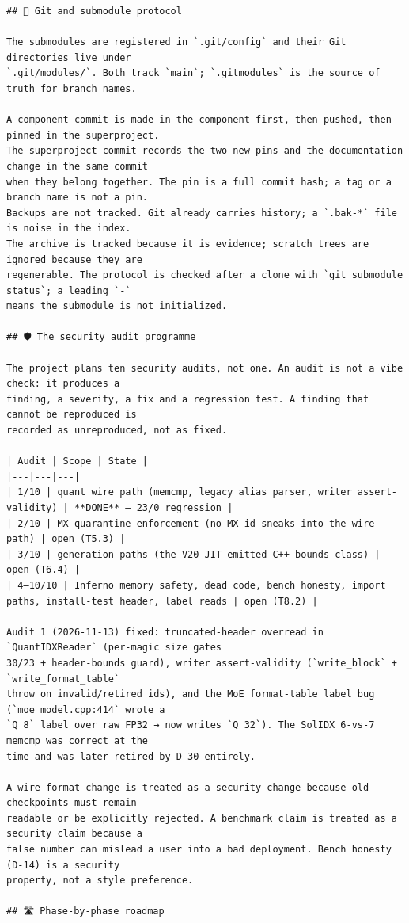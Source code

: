 \begin{Verbatim}[breaklines,breakanywhere,fontsize=\footnotesize]
## 🔗 Git and submodule protocol

The submodules are registered in `.git/config` and their Git directories live under
`.git/modules/`. Both track `main`; `.gitmodules` is the source of truth for branch names.

A component commit is made in the component first, then pushed, then pinned in the superproject.
The superproject commit records the two new pins and the documentation change in the same commit
when they belong together. The pin is a full commit hash; a tag or a branch name is not a pin.
Backups are not tracked. Git already carries history; a `.bak-*` file is noise in the index.
The archive is tracked because it is evidence; scratch trees are ignored because they are
regenerable. The protocol is checked after a clone with `git submodule status`; a leading `-`
means the submodule is not initialized.

## 🛡️ The security audit programme

The project plans ten security audits, not one. An audit is not a vibe check: it produces a
finding, a severity, a fix and a regression test. A finding that cannot be reproduced is
recorded as unreproduced, not as fixed.

| Audit | Scope | State |
|---|---|---|
| 1/10 | quant wire path (memcmp, legacy alias parser, writer assert-validity) | **DONE** — 23/0 regression |
| 2/10 | MX quarantine enforcement (no MX id sneaks into the wire path) | open (T5.3) |
| 3/10 | generation paths (the V20 JIT-emitted C++ bounds class) | open (T6.4) |
| 4–10/10 | Inferno memory safety, dead code, bench honesty, import paths, install-test header, label reads | open (T8.2) |

Audit 1 (2026-11-13) fixed: truncated-header overread in `QuantIDXReader` (per-magic size gates
30/23 + header-bounds guard), writer assert-validity (`write_block` + `write_format_table`
throw on invalid/retired ids), and the MoE format-table label bug (`moe_model.cpp:414` wrote a
`Q_8` label over raw FP32 → now writes `Q_32`). The SolIDX 6-vs-7 memcmp was correct at the
time and was later retired by D-30 entirely.

A wire-format change is treated as a security change because old checkpoints must remain
readable or be explicitly rejected. A benchmark claim is treated as a security claim because a
false number can mislead a user into a bad deployment. Bench honesty (D-14) is a security
property, not a style preference.

## 🛣️ Phase-by-phase roadmap


\end{Verbatim}
